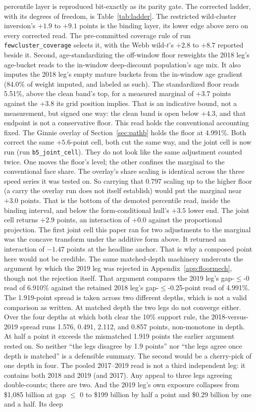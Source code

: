\documentclass[12pt]{article}
\begin{document}
percentile layer is reproduced bit-exactly as its parity gate. The corrected ladder, with its degrees of freedom, is Table~\ref{tab:ladder}. The restricted wild-cluster inversion's $+1.9$ to $+9.1$ points is the binding layer, its lower edge above zero on every corrected read. The pre-committed coverage rule of run \texttt{fewcluster\_coverage} selects it, with the Webb wild-$t$'s $+2.8$ to $+8.7$ reported beside it. Second, age-standardizing the off-window floor reweights the 2018 leg's age-bucket reads to the in-window deep-discount population's age mix. It also imputes the 2018 leg's empty mature buckets from the in-window age gradient (84.0\% of weight imputed, and labeled as such). The standardized floor reads 5.51\%, above the clean band's top, for a measured marginal of $+3.7$ points against the $+3.8$ its grid position implies. That is an indicative bound, not a measurement, but signed one way: the clean band is open below $+4.3$, and that endpoint is not a conservative floor. This read holds the conventional accounting fixed. The Ginnie overlay of Section~\ref{sec:pathb} holds the floor at 4.991\%. Both correct the same $+5.6$-point cell, both cut the same way, and the joint cell is now run (run \texttt{b5\_joint\_cell}). They do not look like the same adjustment counted twice. One moves the floor's level; the other confines the marginal to the conventional face share. The overlay's share scaling is identical across the three speed series it was tested on. So carrying that $0.797$ scaling up to the higher floor (a carry the overlay run does not itself establish) would put the marginal near $+3.0$ points. That is the bottom of the demoted percentile read, inside the binding interval, and below the form-conditional hull's $+3.5$ lower end. The joint cell returns $+2.9$ points, an interaction of $+0.0$ against the proportional projection. The first joint cell this paper ran for two adjustments to the marginal was the concave transform under the additive form above. It returned an interaction of $-1.47$ points at the headline anchor. That is why a composed point here would not be credible. The same matched-depth machinery undercuts the argument by which the 2019 leg was rejected in Appendix~\ref{app:floormech}, though not the rejection itself. That argument compares the 2019 leg's gap-$\leq$-0 read of 6.910\% against the retained 2018 leg's gap-$\leq$-0.25-point read of 4.991\%. The 1.919-point spread is taken across two different depths, which is not a valid comparison as written. At matched depth the two legs do not converge either. Over the four depths at which both clear the 10\% support rule, the 2018-versus-2019 spread runs 1.576, 0.491, 2.112, and 0.857 points, non-monotone in depth. At half a point it exceeds the mismatched 1.919 points the earlier argument rested on. So neither ``the legs disagree by 1.9 points'' nor ``the legs agree once depth is matched'' is a defensible summary. The second would be a cherry-pick of one depth in four. The pooled 2017--2019 read is not a third independent leg: it contains both 2018 and 2019 (and 2017). Any appeal to three legs agreeing double-counts; there are two. And the 2019 leg's own exposure collapses from \$1{,}085 billion at gap $\leq$ 0 to \$199 billion by half a point and \$0.29 billion by one and a half. Its deep 
\end{document}
